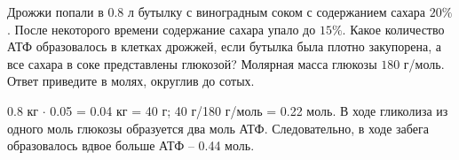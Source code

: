 
Дрожжи попали в 0.8 л бутылку с виноградным соком с
содержанием сахара $20\%$. После некоторого времени содержание сахара упало до
$15\%$. Какое количество АТФ образовалось в клетках дрожжей, если бутылка была
плотно закупорена, а все сахара в соке представлены глюкозой?  Молярная масса глюкозы $180$  г/моль. Ответ
приведите в молях, округлив до сотых.

\solutionSection

0.8 кг $\cdot$ 0.05 = 0.04 кг = 40 г; 40 г/180 г/моль = 0.22 моль. В ходе гликолиза из одного моль глюкозы образуется два моль АТФ. Следовательно, в ходе забега образовалось вдвое больше АТФ – 0.44 моль.

